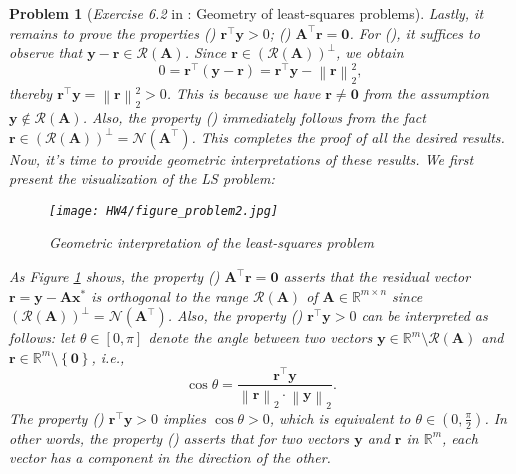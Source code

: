 \documentclass[11pt]{article}
\newtheorem{problem}{Problem}
\numberwithin{equation}{problem}
\begin{document}
\begin{problem} [\emph{Exercise 6.2} in \cite{calafiore2014optimization}: Geometry of least-squares problems]
{\indent Lastly, it remains to prove the properties () $\mathbf{r}^{\top} \mathbf{y} > 0$; () $\mathbf{A}^{\top} \mathbf{r} = \mathbf{0}$. For (), it suffices to observe that $\mathbf{y} - \mathbf{r} \in \mathcal{R}(\mathbf{A})$. Since $\mathbf{r} \in \left( \mathcal{R}(\mathbf{A}) \right)^{\perp}$, we obtain
\begin{equation*}
    0 = \mathbf{r}^{\top} \left( \mathbf{y} - \mathbf{r} \right) = \mathbf{r}^{\top} \mathbf{y} - \left\| \mathbf{r} \right\|_{2}^2,
\end{equation*}
thereby $\mathbf{r}^{\top} \mathbf{y} = \left\| \mathbf{r} \right\|_{2}^2 > 0$. This is because we have $\mathbf{r} \neq \mathbf{0}$ from the assumption $\mathbf{y} \not\in \mathcal{R}(\mathbf{A})$. Also, the property () immediately follows from the fact $\mathbf{r} \in \left( \mathcal{R}(\mathbf{A}) \right)^{\perp} = \mathcal{N} \left( \mathbf{A}^{\top} \right)$. This completes the proof of all the desired results. Now, it's time to provide geometric interpretations of these results. We first present the visualization of the \textsf{LS} problem:

\begin{figure}[h]
    \centering
    \texttt{[image: HW4/figure\_problem2.jpg]}
    \caption{Geometric interpretation of the least-squares problem}
    \label{fig:problem_2}
\end{figure}

\indent As Figure \ref{fig:problem_2} shows, the property () $\mathbf{A}^{\top} \mathbf{r} = \mathbf{0}$ asserts that the residual vector $\mathbf{r} = \mathbf{y} - \mathbf{A} \mathbf{x}^*$ is orthogonal to the range $\mathcal{R}(\mathbf{A})$ of $\mathbf{A} \in \mathbb{R}^{m \times n}$ since $\left( \mathcal{R}(\mathbf{A}) \right)^{\perp} = \mathcal{N} \left( \mathbf{A}^{\top} \right)$. Also, the property () $\mathbf{r}^{\top} \mathbf{y} > 0$ can be interpreted as follows: let $\theta \in \left[ 0, \pi \right]$ denote the angle between two vectors $\mathbf{y} \in \mathbb{R}^m \setminus \mathcal{R} (\mathbf{A})$ and $\mathbf{r} \in \mathbb{R}^m \setminus \left\{ \mathbf{0} \right\}$, \emph{i.e.},
\begin{equation*}
    \cos \theta = \frac{\mathbf{r}^{\top} \mathbf{y}}{\left\| \mathbf{r} \right\|_2 \cdot \left\| \mathbf{y} \right\|_2}.
\end{equation*}
The property () $\mathbf{r}^{\top} \mathbf{y} > 0$ implies $\cos \theta > 0$, which is equivalent to $\theta \in \left( 0, \frac{\pi}{2} \right)$. In other words, the property () asserts that for two vectors $\mathbf{y}$ and $\mathbf{r}$ in $\mathbb{R}^m$, each vector has a component in the direction of the other.

}
\end{problem}
\end{document}
